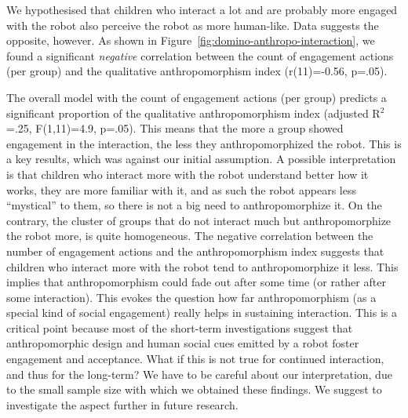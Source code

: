 \documentclass{sig-alternate}
\begin{document}
We hypothesised that children who interact a lot and are probably more engaged
with the robot also perceive the robot as more human-like. Data suggests the
opposite, however. As shown in Figure~\ref{fig:domino-anthropo-interaction}, we
found a significant \textit{negative} correlation between the count of
engagement actions (per group) and the qualitative anthropomorphism index
(r(11)=-0.56, p=.05).


The overall model with the count of engagement actions (per group) predicts a
significant proportion of the qualitative anthropomorphism index (adjusted
R$^2$=.25, F(1,11)=4.9, p=.05). This means that the more a group showed
engagement in the interaction, the less they anthropomorphized the robot. This
is a key results, which was against our initial assumption. A possible
interpretation is that children who interact more with the robot understand better
how it works, they are more familiar with it, and as such the robot appears less
``mystical'' to them, so there is not a big need to anthropomorphize it. On the
contrary, the cluster of groups that do not interact much but anthropomorphize
the robot more, is quite homogeneous. The negative correlation between the
number of engagement actions and the anthropomorphism index suggests that
children who interact more with the robot tend to anthropomorphize it less. This
implies that anthropomorphism could fade out after some time (or rather after
some interaction). This evokes the question how far anthropomorphism (as a
special kind of social engagement) really helps in sustaining interaction. This
is a critical point because most of the short-term investigations suggest that
anthropomorphic design and human social cues emitted by a robot foster
engagement and acceptance. What if this is not true for continued interaction,
and thus for the long-term?  We have to be careful about our interpretation, due
to the small sample size with which we obtained these findings. We suggest to
investigate the aspect further in future research.
\end{document}
